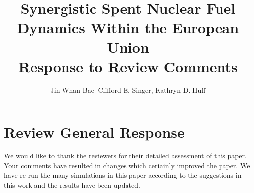 \documentclass[answers,11pt]{exam}
\begin{document}


%

\title{Synergistic Spent Nuclear Fuel Dynamics Within the European Union\\
        \large Response to Review Comments}
\author{Jin Whan Bae, Clifford E. Singer, Kathryn D. Huff}



%
\maketitle
\glsunsetall
\section*{Review General Response}
We would like to thank the reviewers for their detailed assessment of
this paper. Your comments have resulted in changes which certainly improved the 
paper. We have re-run the many simulations in this paper according to the 
suggestions in this work and the results have been updated.
\end{document}
